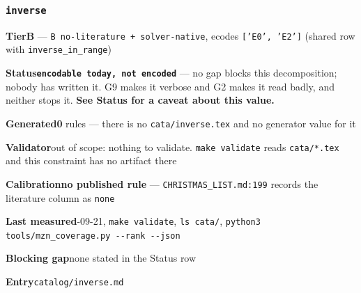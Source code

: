 \documentclass[10pt,a4paper]{article}
\newcommand{\entryfield}[2]{{\raggedright\textbf{#1}\quad #2\par}}
\begin{document}
\subsubsection*{\texttt{inverse}}
\label{entry:inverse}
\entryfield{Tier}{\textbf{B} --- \texttt{B no-\allowbreak{}literature + solver-\allowbreak{}native}, ecodes \texttt{['E0', 'E2']} (shared row with \texttt{inverse\_in\_range})}
\entryfield{Status}{\textbf{\texttt{encodable today, not encoded}} --- no gap blocks this decomposition; nobody has written it. G9 makes it verbose and G2 makes it read badly, and neither stops it. \textbf{See Status for a caveat about this value.}}
\entryfield{Generated}{\textbf{0} rules --- there is no \texttt{cata/inverse.tex} and no generator value for it}
\entryfield{Validator}{out of scope: nothing to validate. \texttt{make validate} reads \texttt{cata/*.tex} and this constraint has no artifact there}
\entryfield{Calibration}{\textbf{no published rule} --- \texttt{CHRISTMAS\_LIST.md:199} records the literature column as \texttt{none}}
\entryfield{Last measured}{2026-09-21, \texttt{make validate}, \texttt{ls cata/}, \texttt{python3 tools/\allowbreak{}mzn\_\allowbreak{}coverage.\allowbreak{}py -\allowbreak{}-\allowbreak{}rank -\allowbreak{}-\allowbreak{}json}}
\entryfield{Blocking gap}{none stated in the Status row}
\entryfield{Entry}{\texttt{catalog/inverse.md}}
\end{document}
